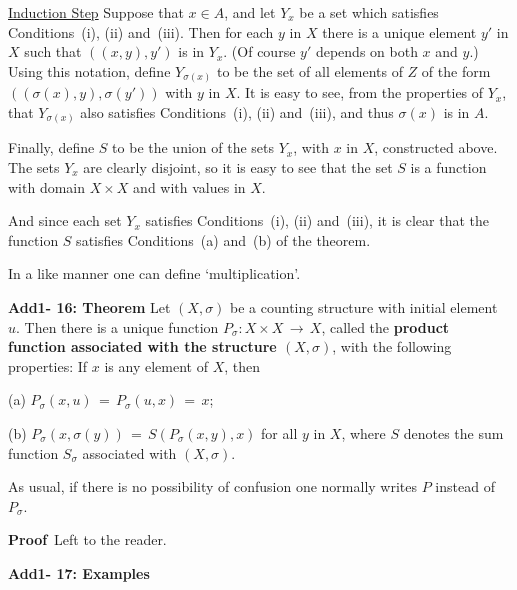         \underline{Induction Step} Suppose that $x{\in}A$, and let $Y_{x}$ be a set which satisfies Conditions~(i), (ii) and~(iii).
    Then for each $y$ in $X$ there is a unique element $y'$ in $X$ such that $((x,y),y')$ is in $Y_{x}$.
    (Of course $y'$  depends on both $x$ and $y$.)
    Using this notation, define $Y_{{\sigma}(x)}$ to be the set of all elements  of $Z$ of the form $(({\sigma}(x),y),{\sigma}(y'))$ with $y$ in $X$.
    It is easy to see, from the properties of $Y_{x}$, that $Y_{{\sigma}(x)}$ also satisfies Conditions~(i), (ii) and~(iii), and thus ${\sigma}(x)$ is in $A$.

        Finally, define $S$ to be the union of the sets $Y_{x}$, with $x$ in $X$, constructed above.
    The sets $Y_{x}$ are clearly disjoint, so it is easy to see that the set $S$ is a function with domain $X{\times}X$ and with values in $X$.

    And since each set $Y_{x}$ satisfies Conditions~(i), (ii) and~(iii), it is clear that the function $S$ satisfies Conditions~(a) and~(b) of the theorem.

\V
\V

        In a like manner one can define `multiplication'.

\V

        {\bf Add1- 16: Theorem} Let $(X,{\sigma})$ be a counting structure with initial element~$u$.
    Then there is a unique function $P_{{\sigma}}:X{\times}X \,{\rightarrow}\, X$, called the {\bf product function associated with the structure $(X,{\sigma})$},
    with the following properties: If $x$ is any element of $X$, then

        (a) $P_{{\sigma}}(x,u) \,=\, P_{{\sigma}}(u,x) \,=\, x$;

        (b) $P_{{\sigma}}(x,{\sigma}(y)) \,=\, S(P_{{\sigma}}(x,y),x)$ for all $y$ in $X$, where $S$ denotes the sum function $S_{{\sigma}}$ associated with $(X,{\sigma})$.

\noindent As usual, if there is no possibility of confusion one normally writes $P$ instead of $P_{{\sigma}}$.

\V

        {\bf Proof}\,  Left to the reader.

\V
\V


        {\bf Add1- 17: Examples}

\V


